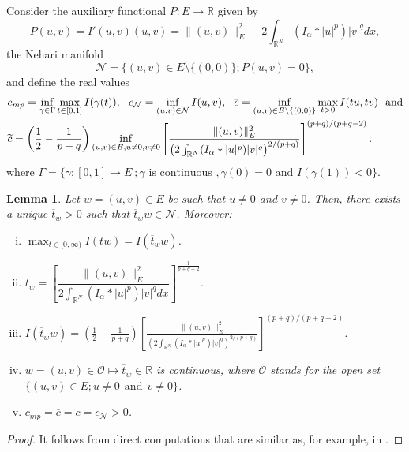 \documentclass[12pt,a4paper]{article}
\newtheorem{lemma}[theorem]{Lemma}
\numberwithin{equation}{section}
\begin{document}
Consider the auxiliary functional $P: E \rightarrow \mathbb{R}$ given by
\begin{equation}\label{eq3}
P(u, v)=I'(u, v)(u, v)=\|(u, v)\|_{E}^{2}-2\int_{\mathbb{R}^N} (I_\alpha \ast |u|^p)|v|^q dx,
\end{equation}
the Nehari manifold
\begin{equation}\label{eq4}
\mathcal{N} = \{(u, v)\in E\setminus \{(0, 0)\} ; P(u, v)=0\}, 
\end{equation}
and define the real values
\begin{align*}
&c_{mp}=\inf\limits_{\gamma\in\Gamma} \max\limits_{t\in [0, 1]} I(\gamma(t)), \ \  c_{\mathcal{N}} = \inf_{(u,v) \in \mathcal{N}} I(u,v), \ \  \overline{c} = \inf\limits_{(u, v)\in E\setminus \{(0, 0)\}} \max\limits_{t>0} I(tu, tv) \ \ \text{and} \vspace{5pt} \\ &\widetilde{c} = \left(\frac{1}{2}-\frac{1}{p+q}\right) \inf_{(u,v)\in E, u \neq 0, v \neq 0}  \left[ \frac{\|(u,v)\|_E^2}{\left(2\int_{\mathbb{R}^N} (I_{\alpha} \ast |u|^p)|v|^q \right)^{2/(p+q)}}\right]^{(p+q)/(p+q-2)}.
\end{align*}
where $\Gamma = \{\gamma:[0, 1]\rightarrow E \ ; \gamma \mbox{ is continuous }, \gamma(0)=0 \mbox{ and } I(\gamma(1))<0\}$.



\begin{lemma}\label{l3}
Let $w = (u,v)\in E$ be such that $u\neq0$ and $v \neq 0$. Then, there exists a unique $\overline{t}_w  >0$ such that $\overline{t}_w w\in \mathcal{N}$. Moreover:
\begin{enumerate}[(i)]
\item $\displaystyle \max_{t \in [0, \infty)} I(tw) = I(\overline{t}_w w)$.
\item $
\overline{t}_w = \left[\dfrac{\|(u, v)\|_{E}^{2}}{2\int_{\mathbb{R}^N} (I_\alpha \ast |u|^p)|v|^q dx} \right]^{\frac{1}{p+q-2}}.
$
\item $\displaystyle I(\overline{t}_w w) = \left(\frac{1}{2}-\frac{1}{p+q}\right)  \left[ \frac{\|(u,v)\|_E^2}{\left(2\int_{\mathbb{R}^N} (I_{\alpha} \ast |u|^p)|v|^q \right)^{2/(p+q)}}\right]^{(p+q)/(p+q-2)}$.
\item $w = (u,v)\in \mathcal{O} \mapsto \overline{t}_w \in \mathbb{R}$ is continuous, where $\mathcal{O}$ stands for the open set $\{ (u,v) \in E ; u\neq 0 \ \ \text{and} \ \ v \neq 0\}$.
\item $c_{mp}= \overline{c} = \widetilde{c}= c_{\mathcal{N}}>0$.
\end{enumerate}
\end{lemma}
\begin{proof}
It follows from direct computations that are similar as, for example, in \cite[Chapter 4]{Willem1996}.
\end{proof}
\end{document}
